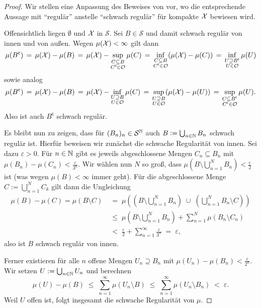\documentclass[../main/main.tex]{subfiles}
\begin{document}
	\begin{proof}
		Wir stellen eine Anpassung des Beweises von 
		\cite[Hilfssatz 4.5.5]{Simon.2015} vor, wo die entsprechende Aussage mit \enquote{regulär} 
		anstelle \enquote{schwach regulär} für kompakte $\mathcal{X}$ bewiesen wird.
		
		Offensichtlich liegen $\emptyset$ und $\mathcal{X}$ in $\mathcal{S}$. Sei 
		$B \in \mathcal{S}$ und damit schwach regulär 
		von innen und von außen. Wegen $\mu(\mathcal{X}) < \infty$ gilt dann
		$$\mu(B^\mathsf{c}) 
		\, = \, \mu(\mathcal{X}) - \mu(B) 
		\, = \, \mu(\mathcal{X}) - \sup_{\substack{C \subseteq B \\ C^\mathsf{c} \in \mathcal{O}}} \mu(C) 
		\, = \, \inf_{\substack{C \subseteq B \\ C^\mathsf{c} \in \mathcal{O}}} (\mu(\mathcal{X}) - \mu(C))
		\, = \, \inf_{\substack{U \supseteq B^\mathsf{c} \\ U \in \mathcal{O}}} \mu(U)$$
		sowie analog
		$$\mu(B^\mathsf{c}) 
		\, = \, \mu(\mathcal{X}) - \mu(B) 
		\, = \, \mu(\mathcal{X}) - \inf_{\substack{U \supseteq B \\ U \in \mathcal{O}}} \mu(C)
		\, = \, \sup_{\substack{U \supseteq B \\ U \in \mathcal{O}}} (\mu(\mathcal{X}) - \mu(U))
		\, = \, \sup_{\substack{C \subseteq B^\mathsf{c} \\ C^\mathsf{c} \in 
				\mathcal{O}}} \mu(U) \text{.}$$
		Also ist auch $B^\mathsf{c}$ schwach regulär. 
		
		Es bleibt nun zu zeigen, dass für $(B_n)_n \in \mathcal{S}^{\mathbb{N}}$ auch $B \vcentcolon = 
		\bigcup_{n \in \mathbb{N}} B_n$ schwach regulär ist. 
		Hierfür beweisen wir zunächst die schwache Regularität von innen. 
		Sei dazu $\varepsilon > 0$. Für $n \in \mathbb{N}$ gibt es jeweils abgeschlossene Mengen 
		$C_n \subseteq B_n$ mit $\mu(B_n) - \mu(C_n) < \frac{\varepsilon}{3^n}$.
		Wir wählen nun $N$ so groß, dass $\mu\left( B \setminus \bigcup_{n=1}^N B_n \right) 
		< \frac{\varepsilon}{2}$ ist (was wegen $\mu(B) < \infty$ immer geht). 
		Für die abgeschlossene Menge $C := \bigcup_{n=1}^N C_k$ gilt dann die Ungleichung 
		\begin{align*}
			\mu(B) - \mu(C) = \mu(B\setminus C) \; &=
			\; \mu\left( \left( B \setminus \bigcup_{n=1}^N B_n \right) \; \cup \; 
			\left( \bigcup_{n=1}^N B_n  \setminus C \right) \right) \\
			&\leq \; \mu \left( B \setminus \bigcup_{n=1}^N B_n \right) + 
			\sum_{n=1}^{N} \mu(B_n \setminus C_n) \\
			&<    \; \frac{\varepsilon}{2} + 
			\sum_{n=1}^{\infty} \frac{\varepsilon}{3^n} \; = \; \varepsilon \text{,}
		\end{align*}
		also ist $B$ schwach regulär von innen.
		
		Ferner existieren für alle $n$ offene Mengen $U_n \supseteq B_n$ 
		mit $\mu(U_n) - \mu(B_n) < \frac{\varepsilon}{2^n}$. Wir setzen 
		$U := \bigcup_{n \in \mathbb{N}} U_n$ und berechnen  
		$$\mu(U) - \mu(B) \; \leq \; \sum_{n=1}^\infty \mu(U_n \setminus B) \; \leq \; 
		\sum_{n=1}^\infty \mu(U_n \setminus B_n) \; < \; \varepsilon \text{.}$$
		Weil $U$ offen ist, folgt insgesamt die schwache Regularität von $\mu$.
	\end{proof}
	
\end{document}
